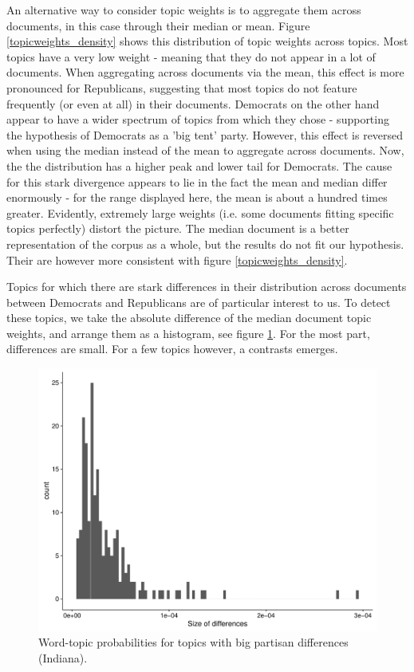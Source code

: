 \documentclass[11pt]{article}
\begin{document}
An alternative way to consider topic weights is to aggregate them across documents, in this case through their median or mean. Figure \ref{topicweights_density} shows this distribution of topic weights across topics. Most topics have a very low weight - meaning that they do not appear in a lot of documents. When aggregating across documents via the mean, this effect is more pronounced for Republicans, suggesting that most topics do not feature frequently (or even at all) in their documents. Democrats on the other hand appear to have a wider spectrum of topics from which they chose - supporting the hypothesis of Democrats as a 'big tent' party. However, this effect is reversed when using the median instead of the mean to aggregate across documents. Now, the the distribution has a higher peak and lower tail for Democrats. The cause for this stark divergence appears to lie in the fact the mean and median differ enormously - for the range displayed here, the mean is about a hundred times greater. Evidently, extremely large weights (i.e. some documents fitting specific topics perfectly) distort the picture. The median document is a better representation of the corpus as a whole, but the results do not fit our hypothesis. Their are however more consistent with figure \ref{topicweights_density}.


Topics for which there are stark differences in their distribution across documents between Democrats and Republicans are of particular interest to us. To detect these topics, we take the absolute difference of the median document topic weights, and arrange them as a histogram, see figure \ref{diffsize}. For the most part, differences are small. For a few topics however, a contrasts emerges.

\begin{figure}[!ht]
	\centering %
	\caption{Word-topic probabilities for topics with big partisan differences (Indiana).}
	\label{diffsize}
	\includegraphics[width=\linewidth]{figures/diffsize_IN.pdf}
\end{figure}
\end{document}
